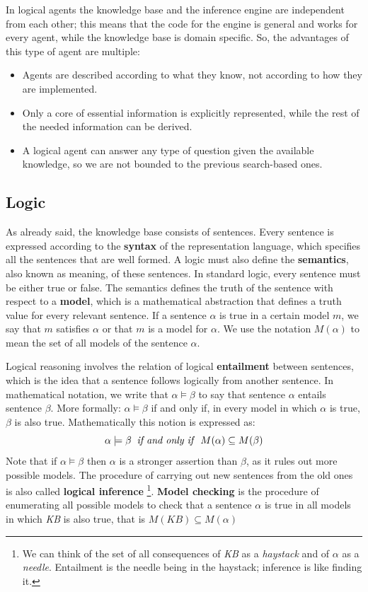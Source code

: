 \documentclass{article}
\begin{document}
In logical agents the knowledge base and the inference engine are independent from each other; this means that the code for the engine is general and works for every agent, while the knowledge base is domain specific. So, the advantages of this type of agent are multiple:
\begin{itemize}
    \item Agents are described according to what they know, not according to how they are implemented.
    \item Only a core of essential information is explicitly represented, while the rest of the needed information can be derived.
    \item A logical agent can answer any type of question given the available knowledge, so we are not bounded to the previous search-based ones.
\end{itemize}

\subsection{Logic}
As already said, the knowledge base consists of sentences. Every sentence is expressed according to the \textbf{syntax} of the representation language, which specifies all the sentences that are well formed. A logic must also define the \textbf{semantics}, also known as meaning, of these sentences. In standard logic, every sentence must be either true or false. The semantics defines the truth of the sentence with respect to a \textbf{model}, which is a mathematical abstraction that defines a truth value for every relevant sentence.  If a sentence $\alpha$ is true in a certain model $m$, we say that $m$ satisfies $\alpha$ or that $m$ is a model for $\alpha$. We use the notation $M(\alpha)$ to mean the set of all models of the sentence $\alpha$.

Logical reasoning involves the relation of logical \textbf{entailment} between sentences, which is the idea that a sentence follows logically from another sentence. In mathematical notation, we write that $\alpha\models\beta$ to say that sentence $\alpha$ entails sentence $\beta$. More formally: $\alpha\models\beta$ if and only if, in every model in which $\alpha$ is true, $\beta$ is also true. Mathematically this notion is expressed as:
$$\alpha \models \beta \;\; \text{\textit{if and only if}} \;\; M(\alpha) \subseteq M(\beta)$$
Note that if $\alpha \models \beta $ then $\alpha$ is a stronger assertion than $\beta$, as it rules out more possible models. The procedure of carrying out new sentences from the old ones is also called \textbf{logical inference} \footnote{We can think of the set of all consequences of \textit{KB} as a \textit{haystack} and of $\alpha$ as a \textit{needle}. Entailment is the needle being in the haystack; inference is like finding it.}. \textbf{Model checking} is the procedure of enumerating all possible models to check that a sentence $\alpha$ is true in all models in which \textit{KB} is also true, that is $M(KB)\subseteq M(\alpha)$
\end{document}
